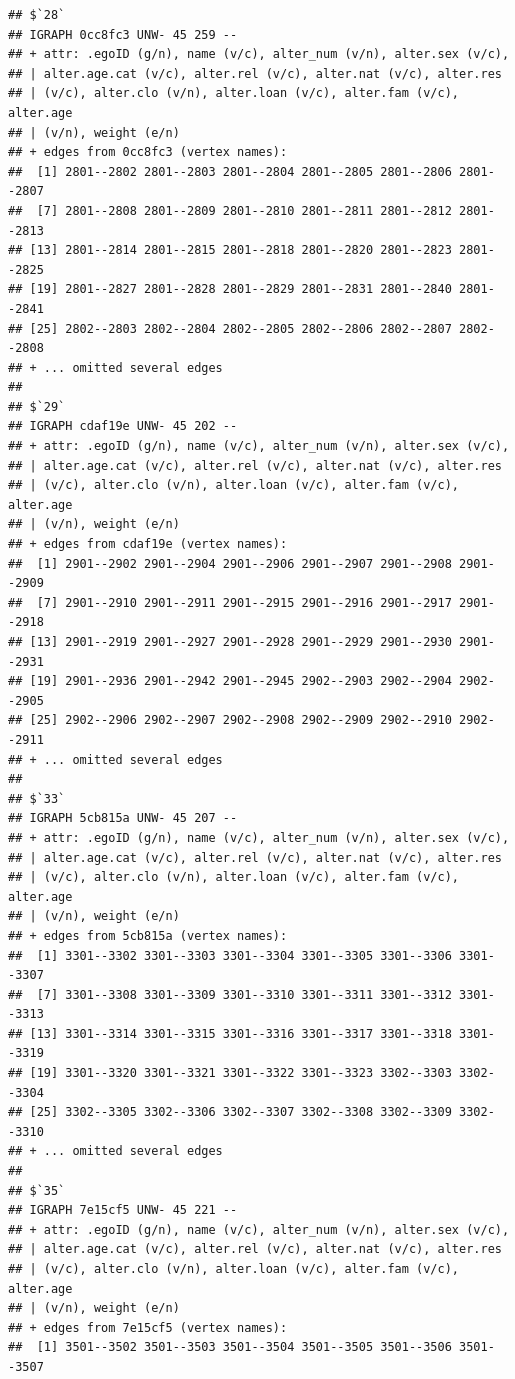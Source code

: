 \documentclass[
]{book}
\begin{document}
\begin{verbatim}
## $`28`
## IGRAPH 0cc8fc3 UNW- 45 259 -- 
## + attr: .egoID (g/n), name (v/c), alter_num (v/n), alter.sex (v/c),
## | alter.age.cat (v/c), alter.rel (v/c), alter.nat (v/c), alter.res
## | (v/c), alter.clo (v/n), alter.loan (v/c), alter.fam (v/c), alter.age
## | (v/n), weight (e/n)
## + edges from 0cc8fc3 (vertex names):
##  [1] 2801--2802 2801--2803 2801--2804 2801--2805 2801--2806 2801--2807
##  [7] 2801--2808 2801--2809 2801--2810 2801--2811 2801--2812 2801--2813
## [13] 2801--2814 2801--2815 2801--2818 2801--2820 2801--2823 2801--2825
## [19] 2801--2827 2801--2828 2801--2829 2801--2831 2801--2840 2801--2841
## [25] 2802--2803 2802--2804 2802--2805 2802--2806 2802--2807 2802--2808
## + ... omitted several edges
## 
## $`29`
## IGRAPH cdaf19e UNW- 45 202 -- 
## + attr: .egoID (g/n), name (v/c), alter_num (v/n), alter.sex (v/c),
## | alter.age.cat (v/c), alter.rel (v/c), alter.nat (v/c), alter.res
## | (v/c), alter.clo (v/n), alter.loan (v/c), alter.fam (v/c), alter.age
## | (v/n), weight (e/n)
## + edges from cdaf19e (vertex names):
##  [1] 2901--2902 2901--2904 2901--2906 2901--2907 2901--2908 2901--2909
##  [7] 2901--2910 2901--2911 2901--2915 2901--2916 2901--2917 2901--2918
## [13] 2901--2919 2901--2927 2901--2928 2901--2929 2901--2930 2901--2931
## [19] 2901--2936 2901--2942 2901--2945 2902--2903 2902--2904 2902--2905
## [25] 2902--2906 2902--2907 2902--2908 2902--2909 2902--2910 2902--2911
## + ... omitted several edges
## 
## $`33`
## IGRAPH 5cb815a UNW- 45 207 -- 
## + attr: .egoID (g/n), name (v/c), alter_num (v/n), alter.sex (v/c),
## | alter.age.cat (v/c), alter.rel (v/c), alter.nat (v/c), alter.res
## | (v/c), alter.clo (v/n), alter.loan (v/c), alter.fam (v/c), alter.age
## | (v/n), weight (e/n)
## + edges from 5cb815a (vertex names):
##  [1] 3301--3302 3301--3303 3301--3304 3301--3305 3301--3306 3301--3307
##  [7] 3301--3308 3301--3309 3301--3310 3301--3311 3301--3312 3301--3313
## [13] 3301--3314 3301--3315 3301--3316 3301--3317 3301--3318 3301--3319
## [19] 3301--3320 3301--3321 3301--3322 3301--3323 3302--3303 3302--3304
## [25] 3302--3305 3302--3306 3302--3307 3302--3308 3302--3309 3302--3310
## + ... omitted several edges
## 
## $`35`
## IGRAPH 7e15cf5 UNW- 45 221 -- 
## + attr: .egoID (g/n), name (v/c), alter_num (v/n), alter.sex (v/c),
## | alter.age.cat (v/c), alter.rel (v/c), alter.nat (v/c), alter.res
## | (v/c), alter.clo (v/n), alter.loan (v/c), alter.fam (v/c), alter.age
## | (v/n), weight (e/n)
## + edges from 7e15cf5 (vertex names):
##  [1] 3501--3502 3501--3503 3501--3504 3501--3505 3501--3506 3501--3507

\end{verbatim}
\end{document}
